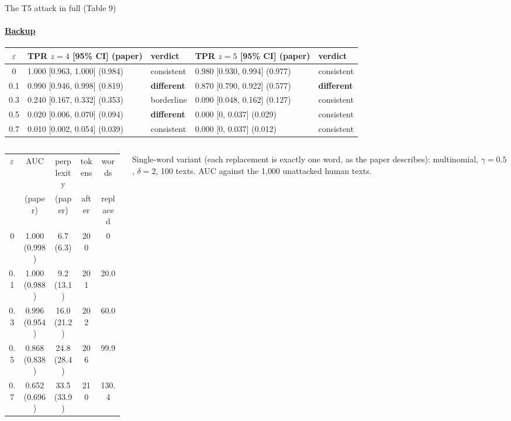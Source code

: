 \documentclass[aspectratio=169,10pt,t]{beamer}
\newcommand{\warn}[1]{\textcolor{signal}{\textbf{#1}}}
\begin{document}
\begin{frame}[label=b8]{The T5 attack in full (Table 9)}
  \framesubtitle{\hyperlink{b0}{Backup}}
  \scriptsize
  \begin{center}
  \begin{tabular}{@{}cllll@{}}
    \toprule
    $\varepsilon$ & TPR $z = 4$ [95\% CI] (paper) & verdict & TPR $z = 5$ [95\% CI] (paper) & verdict \\
    \midrule
    0 & 1.000 [0.963, 1.000] (0.984) & consistent & 0.980 [0.930, 0.994] (0.977) & consistent \\
    0.1 & 0.990 [0.946, 0.998] (0.819) & \warn{different} & 0.870 [0.790, 0.922] (0.577) & \warn{different} \\
    0.3 & 0.240 [0.167, 0.332] (0.353) & borderline & 0.090 [0.048, 0.162] (0.127) & consistent \\
    0.5 & 0.020 [0.006, 0.070] (0.094) & \warn{different} & 0.000 [0, 0.037] (0.029) & consistent \\
    0.7 & 0.010 [0.002, 0.054] (0.039) & consistent & 0.000 [0, 0.037] (0.012) & consistent \\
    \bottomrule
  \end{tabular}
  \end{center}
  \vspace{0.2em}
  \begin{columns}[T,onlytextwidth]
    \begin{column}{0.50\textwidth}
      \begin{tabular}{@{}ccccc@{}}
        \toprule
        $\varepsilon$ & AUC & perplexity & tokens & words \\
         & (paper) & (paper) & after & replaced \\
        \midrule
        0 & 1.000 (0.998) & 6.7 (6.3) & 200 & 0 \\
        0.1 & 1.000 (0.988) & 9.2 (13.1) & 201 & 20.0 \\
        0.3 & 0.996 (0.954) & 16.0 (21.2) & 202 & 60.0 \\
        0.5 & 0.868 (0.838) & 24.8 (28.4) & 206 & 99.9 \\
        0.7 & 0.652 (0.696) & 33.5 (33.9) & 210 & 130.4 \\
        \bottomrule
      \end{tabular}
    \end{column}
    \begin{column}{0.46\textwidth}
      \small\raggedright
      Single-word variant (each replacement is exactly one word, as the paper describes): multinomial, $\gamma = 0.5$, $\delta = 2$, 100 texts. AUC against the 1{,}000 unattacked human texts.\par\vspace{0.3em}

\end{column}
\end{columns}
\end{frame}
\end{document}
